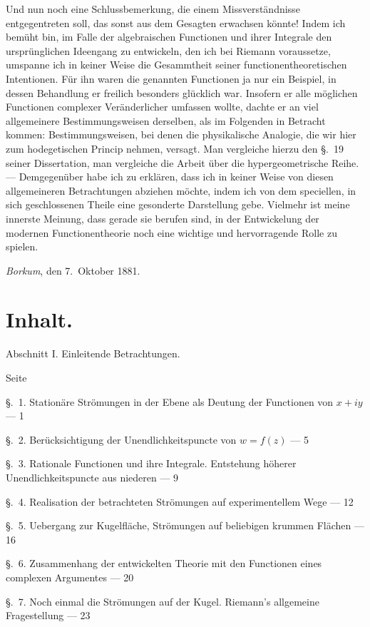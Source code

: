 \documentclass{article}
\begin{document}
Und nun noch eine Schlussbemerkung, die einem Missverständnisse entgegentreten soll, das sonst aus dem Gesagten erwachsen könnte! Indem ich bemüht bin, im Falle der algebraischen Functionen und ihrer Integrale den ursprünglichen Ideengang zu entwickeln, den ich bei Riemann voraussetze, umspanne ich in keiner Weise die Gesammtheit seiner functionentheoretischen Intentionen. Für ihn waren die genannten Functionen ja nur ein Beispiel, in dessen Behandlung er freilich besonders glücklich war. Insofern er alle möglichen Functionen complexer Veränderlicher umfassen wollte, dachte er an viel allgemeinere Bestimmungsweisen derselben, als im Folgenden in Betracht kommen: Bestimmungsweisen, bei denen die physikalische Analogie, die wir hier zum hodegetischen Princip nehmen, versagt. Man vergleiche hierzu den §.~19 seiner Dissertation, man vergleiche die Arbeit über die hypergeometrische Reihe. --- Demgegenüber habe ich zu erklären, dass ich in keiner Weise von diesen allgemeineren Betrachtungen abziehen möchte, indem ich von dem speciellen, in sich geschlossenen Theile eine gesonderte Darstellung gebe. Vielmehr ist meine innerste Meinung, dass gerade sie berufen sind, in der Entwickelung der modernen Functionentheorie noch eine wichtige und hervorragende Rolle zu spielen.

\emph{Borkum}, den 7.~Oktober 1881.


\section*{Inhalt.}

Abschnitt I. Einleitende Betrachtungen.

Seite

§.~1. Stationäre Strömungen in der Ebene als Deutung der Functionen von $x + iy$ --- 1

§.~2. Berücksichtigung der Unendlichkeitspuncte von $w = f(z)$ --- 5

§.~3. Rationale Functionen und ihre Integrale. Entstehung höherer Unendlichkeitspuncte aus niederen --- 9

§.~4. Realisation der betrachteten Strömungen auf experimentellem Wege --- 12

§.~5. Uebergang zur Kugelfläche, Strömungen auf beliebigen krummen Flächen --- 16

§.~6. Zusammenhang der entwickelten Theorie mit den Functionen eines complexen Argumentes --- 20

§.~7. Noch einmal die Strömungen auf der Kugel. Riemann's allgemeine Fragestellung --- 23
\end{document}

